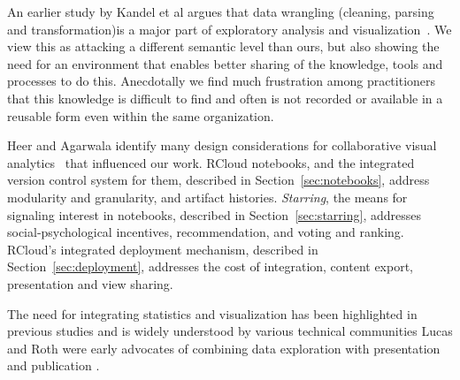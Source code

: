 An earlier study by Kandel et al argues that data wrangling
(cleaning, parsing and transformation)is a major part of exploratory
analysis and visualization~\cite{Kandel:2011:RDI}. We view this
as attacking a different semantic level than ours, but also
showing the need for an environment that enables better sharing
of the knowledge, tools and processes to do this. Anecdotally
we find much frustration among practitioners that this knowledge
is difficult to find and often is not recorded or available in a
reusable form even within the same organization.

Heer and Agarwala identify many design considerations for
collaborative visual analytics~\cite{Heer:2008:DCF} that
influenced our work.
RCloud notebooks, and the integrated version control system for them,
described in Section~\ref{sec:notebooks}, address modularity and granularity,
and artifact histories.
\emph{Starring}, the means for signaling interest in notebooks, described in
Section~\ref{sec:starring}, addresses social-psychological incentives,
recommendation, and voting and ranking. RCloud's integrated deployment
mechanism, described in Section~\ref{sec:deployment}, addresses the cost of
integration, content export, presentation and view sharing.

The need for integrating statistics and visualization has been
highlighted in previous studies and is widely understood by
various technical communities \cite{Perer:2008:ISA}
Lucas and Roth were early advocates of combining
data exploration with presentation and publication \cite{Lucas:1996:EIV}.

